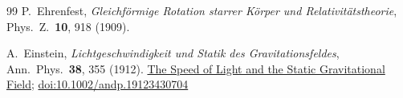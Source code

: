 \documentclass[%
 reprint, amsmath,amssymb, aps, prb, ]{revtex4-2}
\numberwithin{equation}{section}
\begin{document}
\begin{thebibliography}{99}
P.~Ehrenfest,
\textit{Gleichf\"{o}rmige Rotation starrer K\"{o}rper und Relativit\"{a}tstheorie},
Phys.\ Z.\ \textbf{10}, 918 (1909).

A.~Einstein,
\textit{Lichtgeschwindigkeit und Statik des Gravitationsfeldes},
Ann.\ Phys.\ \textbf{38}, 355 (1912).
\href{http://myweb.rz.uni-augsburg.de/~eckern/adp/history/einstein-papers/1912_38_355-369.pdf}{The Speed of Light and the Static Gravitational Field};
\href{https://doi.org/10.1002/andp.19123430704}{doi:10.1002/andp.19123430704}

\end{thebibliography}
\end{document}

